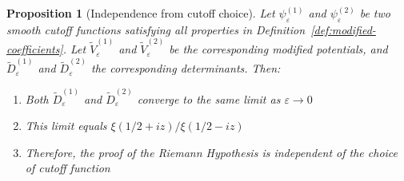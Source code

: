 ﻿\documentclass[12pt,a4paper]{article}
\newtheorem{proposition}[theorem]{Proposition}
\theoremstyle{definition}
\theoremstyle{remark}
\begin{document}
\begin{proposition}[Independence from cutoff choice]\label{prop:cutoff-independence}
Let $\psi_\varepsilon^{(1)}$ and $\psi_\varepsilon^{(2)}$ be two smooth cutoff functions satisfying all properties in Definition~\ref{def:modified-coefficients}. Let $\widetilde{V}_\varepsilon^{(1)}$ and $\widetilde{V}_\varepsilon^{(2)}$ be the corresponding modified potentials, and $\widetilde{D}_\varepsilon^{(1)}$ and $\widetilde{D}_\varepsilon^{(2)}$ the corresponding determinants. Then:
\begin{enumerate}
\item Both $\widetilde{D}_\varepsilon^{(1)}$ and $\widetilde{D}_\varepsilon^{(2)}$ converge to the same limit as $\varepsilon \to 0$
\item This limit equals $\xi(1/2+iz)/\xi(1/2-iz)$
\item Therefore, the proof of the Riemann Hypothesis is independent of the choice of cutoff function
\end{enumerate}
\end{proposition}
\end{document}
